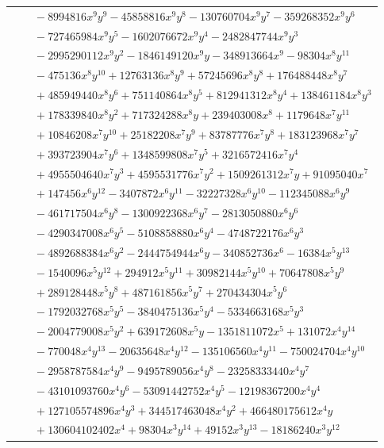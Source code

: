 \documentclass[11pt]{article}
\begin{document}
\begin{longtable}{@{}ll@{}}
 & $\quad -8994816x^{9}y^{9}-45858816x^{9}y^{8}-130760704x^{9}y^{7}-359268352x^{9}y^{6}$\\
 & $\quad -727465984x^{9}y^{5}-1602076672x^{9}y^{4}-2482847744x^{9}y^{3}$\\
 & $\quad -2995290112x^{9}y^{2}-1846149120x^{9}y-348913664x^{9}-98304x^{8}y^{11}$\\
 & $\quad -475136x^{8}y^{10}+12763136x^{8}y^{9}+57245696x^{8}y^{8}+176488448x^{8}y^{7}$\\
 & $\quad +485949440x^{8}y^{6}+751140864x^{8}y^{5}+812941312x^{8}y^{4}+138461184x^{8}y^{3}$\\
 & $\quad +178339840x^{8}y^{2}+717324288x^{8}y+239403008x^{8}+1179648x^{7}y^{11}$\\
 & $\quad +10846208x^{7}y^{10}+25182208x^{7}y^{9}+83787776x^{7}y^{8}+183123968x^{7}y^{7}$\\
 & $\quad +393723904x^{7}y^{6}+1348599808x^{7}y^{5}+3216572416x^{7}y^{4}$\\
 & $\quad +4955504640x^{7}y^{3}+4595531776x^{7}y^{2}+1509261312x^{7}y+91095040x^{7}$\\
 & $\quad +147456x^{6}y^{12}-3407872x^{6}y^{11}-32227328x^{6}y^{10}-112345088x^{6}y^{9}$\\
 & $\quad -461717504x^{6}y^{8}-1300922368x^{6}y^{7}-2813050880x^{6}y^{6}$\\
 & $\quad -4290347008x^{6}y^{5}-5108858880x^{6}y^{4}-4748722176x^{6}y^{3}$\\
 & $\quad -4892688384x^{6}y^{2}-2444754944x^{6}y-340852736x^{6}-16384x^{5}y^{13}$\\
 & $\quad -1540096x^{5}y^{12}+294912x^{5}y^{11}+30982144x^{5}y^{10}+70647808x^{5}y^{9}$\\
 & $\quad +289128448x^{5}y^{8}+487161856x^{5}y^{7}+270434304x^{5}y^{6}$\\
 & $\quad -1792032768x^{5}y^{5}-3840475136x^{5}y^{4}-5334663168x^{5}y^{3}$\\
 & $\quad -2004779008x^{5}y^{2}+639172608x^{5}y-1351811072x^{5}+131072x^{4}y^{14}$\\
 & $\quad -770048x^{4}y^{13}-20635648x^{4}y^{12}-135106560x^{4}y^{11}-750024704x^{4}y^{10}$\\
 & $\quad -2958787584x^{4}y^{9}-9495789056x^{4}y^{8}-23258333440x^{4}y^{7}$\\
 & $\quad -43101093760x^{4}y^{6}-53091442752x^{4}y^{5}-12198367200x^{4}y^{4}$\\
 & $\quad +127105574896x^{4}y^{3}+344517463048x^{4}y^{2}+466480175612x^{4}y$\\
 & $\quad +130604102402x^{4}+98304x^{3}y^{14}+49152x^{3}y^{13}-18186240x^{3}y^{12}$\\

\end{longtable}
\end{document}
